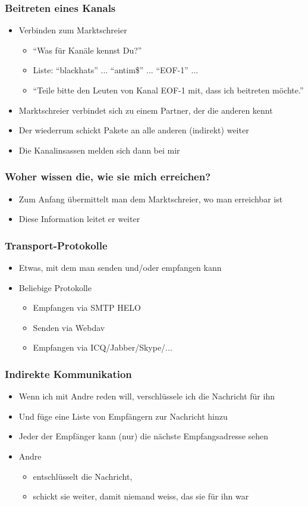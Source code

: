 \documentclass{beamer}
\begin{document}
\frame
{
  \frametitle{Beitreten eines Kanals}

  \begin{itemize}
  \item Verbinden zum Marktschreier
  \pause
  \begin{itemize}
  \item "`Was f\"ur Kan\"ale kennst Du?"'
  \pause
  \item Liste: "`blackhats"' ... "`antim\$"' ... "`EOF-1"' ...
  \pause
  \item "`Teile bitte den Leuten von Kanal EOF-1 mit, dass ich beitreten m\"ochte."'
  \pause
  \end{itemize}
  \item Marktschreier verbindet sich zu einem Partner, der die anderen kennt
  \pause
  \item Der wiederrum schickt Pakete an alle anderen (indirekt) weiter
  \pause
  \item Die Kanalinsassen melden sich dann bei mir
  \end{itemize}
}

\frame
{
  \frametitle{Woher wissen die, wie sie mich erreichen?}

  \begin{itemize}
  \item Zum Anfang \"ubermittelt man dem Marktschreier, wo man erreichbar ist
  \pause
  \item Diese Information leitet er weiter
  \end{itemize}
}

\frame
{
  \frametitle{Transport-Protokolle}

  \begin{itemize}
  \item Etwas, mit dem man senden und/oder empfangen kann
  \pause
  \item Beliebige Protokolle
  \pause
  \begin{itemize}
  \item Empfangen via SMTP HELO
  \pause
  \item Senden via Webdav
  \pause
  \item Empfangen via ICQ/Jabber/Skype/...
  \end{itemize}
  \end{itemize}
}

\frame
{
  \frametitle{Indirekte Kommunikation}

  \begin{itemize}
  \item Wenn ich mit Andre reden will, verschl\"ussele ich die Nachricht f\"ur ihn
  \pause
  \item Und f\"uge eine Liste von Empf\"angern zur Nachricht hinzu
  \pause
  \item Jeder der Empf\"anger kann (nur) die n\"achste Empfangsadresse sehen
  \pause
  \item Andre
  \pause
  \begin{itemize}
  \item entschl\"usselt die Nachricht, 
  \pause
  \item schickt sie weiter, damit niemand weiss, das sie f\"ur ihn war
  \end{itemize}
  \end{itemize}
}
\end{document}
